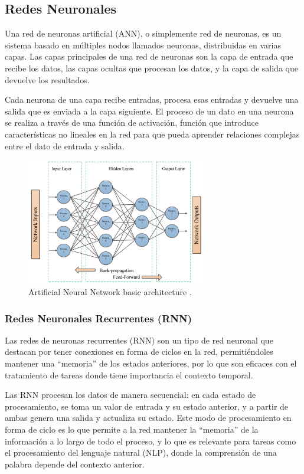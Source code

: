 \documentclass[12pt]{report} %
\begin{document}
\subsection{Redes Neuronales}

Una red de neuronas artificial (ANN), o simplemente red de neuronas, es un sistema basado en múltiples nodos llamados neuronas, distribuidas en varias capas. Las capas principales de una red de neuronas son la capa de entrada que recibe los datos, las capas ocultas que procesan los datos, y la capa de salida que devuelve los resultados. 
\cite{annReview}

Cada neurona de una capa recibe entradas, procesa esas entradas y devuelve una salida que es enviada a la capa siguiente. El proceso de un dato en una neurona se realiza a través de una función de activación, función que introduce características no lineales en la red para que pueda aprender relaciones complejas entre el dato de entrada y salida.

\begin{figure}[h]
	\centering
	\includegraphics[width=0.7\textwidth]{annStructure.png}
	\caption{Artificial Neural Network basic architecture \cite{annReview}.}
	\label{fig:imagen25}
\end{figure}

\subsubsection{Redes Neuronales Recurrentes (RNN)}

Las redes de neuronas recurrentes (RNN) son un tipo de red neuronal que destacan por tener conexiones en forma de ciclos en la red, permitiéndoles mantener una “memoria” de los estados anteriores, por lo que son eficaces con el tratamiento de tareas donde tiene importancia el contexto temporal. 
\cite{artInt} \cite{annReview}

Las RNN procesan los datos de manera secuencial: en cada estado de procesamiento, se toma un valor de entrada y su estado anterior, y a partir de ambas genera una salida y actualiza su estado. Este modo de procesamiento en forma de ciclo es lo que permite a la red mantener la “memoria” de la información a lo largo de todo el proceso, y lo que es relevante para tareas como el procesamiento del lenguaje natural (NLP), donde la comprensión de una palabra depende del contexto anterior.
\end{document}
